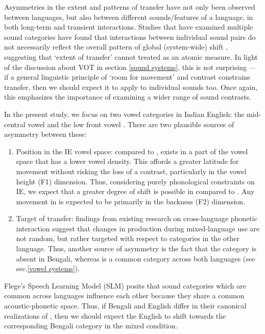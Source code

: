 \documentclass[12 pt]{article}
\newcommand{\nt}[1]{\textipa{[#1]}} %
\begin{document}
Asymmetries in the extent and patterns of transfer have not only been observed between languages, but also between different sounds/features of a language, in both long-term and transient interactions. Studies that have examined multiple sound categories have found that interactions between individual sound pairs do not necessarily reflect the overall pattern of global (system-wide) shift \citep[e.g.][vowel quality]{chang2012rapid,elias2017effects}, suggesting that `extent of transfer' cannot treated as an atomic measure. In light of the discussion about VOT in section \ref{sound systems}, this is not surprising --- if a general linguistic principle of `room for movement' and contrast constrains transfer, then we should expect it to apply to individual sounds too. Once again, this emphasizes the importance of examining a wider range of sound contrasts.


In the present study, we focus on two vowel categories in Indian English: the mid-central vowel \nt{2} and the low front vowel \nt{\ae}. There are two plausible sources of asymmetry between these:
\begin{enumerate}
	\item Position in the IE vowel space: compared to \nt{\ae}, \nt{2} exists in a part of the vowel space that has a lower vowel density. This affords a greater latitude for movement without risking the loss of a contrast, particularly in the vowel height (F1) dimension. Thus, considering purely phonological constraints on IE, we expect that a greater degree of shift is possible in \nt{2} compared to \nt{\ae}. Any movement in \nt{\ae} is expected to be primarily in the backness (F2) dimension.
	\item Target of transfer: findings from existing research on cross-language phonetic interaction suggest that changes in production during mixed-language use are not random, but rather targeted with respect to categories in the other language. Thus, another source of asymmetry is the fact that the category \nt{2} is absent in Bengali, whereas \nt{\ae} is a common category across both languages (see sec.\ref{vowel systems}).
\end{enumerate}


Flege's Speech Learning Model (SLM) \citeyearpar{flege1995second,flege2007language} posits that sound categories which are common across languages influence each other because they share a common acoustic-phonetic space. Thus, if Bengali and English differ in their canonical realizations of \nt{\ae}, then we should expect the English \nt{\ae} to shift towards the corresponding Bengali category in the mixed condition. 
\end{document}
